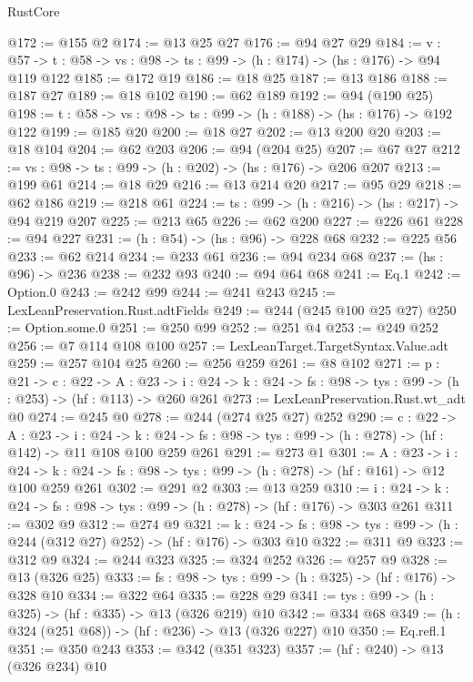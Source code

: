 \begin{lexlean}{RustCore}
\begin{coremodule}
@172 := @155 @2
@174 := @13 @25 @27
@176 := @94 @27 @29
@184 := {v : @57} ->
  {t : @58} -> {vs : @98} -> {ts : @99} -> (h : @174) -> (hs : @176) -> @94 @119 @122
@185 := @172 @19
@186 := @18 @25
@187 := @13 @186
@188 := @187 @27
@189 := @18 @102
@190 := @62 @189
@192 := @94 (@190 @25)
@198 := {t : @58} -> {vs : @98} -> {ts : @99} -> (h : @188) -> (hs : @176) -> @192 @122
@199 := @185 @20
@200 := @18 @27
@202 := @13 @200 @20
@203 := @18 @104
@204 := @62 @203
@206 := @94 (@204 @25)
@207 := @67 @27
@212 := {vs : @98} -> {ts : @99} -> (h : @202) -> (hs : @176) -> @206 @207
@213 := @199 @61
@214 := @18 @29
@216 := @13 @214 @20
@217 := @95 @29
@218 := @62 @186
@219 := @218 @61
@224 := {ts : @99} -> (h : @216) -> (hs : @217) -> @94 @219 @207
@225 := @213 @65
@226 := @62 @200
@227 := @226 @61
@228 := @94 @227
@231 := (h : @54) -> (hs : @96) -> @228 @68
@232 := @225 @56
@233 := @62 @214
@234 := @233 @61
@236 := @94 @234 @68
@237 := (hs : @96) -> @236
@238 := @232 @93
@240 := @94 @64 @68
@241 := Eq.{1}
@242 := Option.{0}
@243 := @242 @99
@244 := @241 @243
@245 := LexLeanPreservation.Rust.adtFields
@249 := @244 (@245 @100 @25 @27)
@250 := Option.some.{0}
@251 := @250 @99
@252 := @251 @4
@253 := @249 @252
@256 := @7 @114 @108 @100
@257 := LexLeanTarget.TargetSyntax.Value.adt
@259 := @257 @104 @25
@260 := @256 @259
@261 := @8 @102
@271 := {p : @21} ->
  {c : @22} ->
  {A : @23} ->
  {i : @24} -> {k : @24} -> {fs : @98} -> {tys : @99} -> (h : @253) -> (hf : @113) -> @260 @261
@273 := LexLeanPreservation.Rust.wt_adt @0
@274 := @245 @0
@278 := @244 (@274 @25 @27) @252
@290 := {c : @22} ->
  {A : @23} ->
  {i : @24} ->
  {k : @24} -> {fs : @98} -> {tys : @99} -> (h : @278) -> (hf : @142) -> @11 @108 @100 @259 @261
@291 := @273 @1
@301 := {A : @23} ->
  {i : @24} ->
  {k : @24} -> {fs : @98} -> {tys : @99} -> (h : @278) -> (hf : @161) -> @12 @100 @259 @261
@302 := @291 @2
@303 := @13 @259
@310 := {i : @24} ->
  {k : @24} -> {fs : @98} -> {tys : @99} -> (h : @278) -> (hf : @176) -> @303 @261
@311 := @302 @9
@312 := @274 @9
@321 := {k : @24} ->
  {fs : @98} -> {tys : @99} -> (h : @244 (@312 @27) @252) -> (hf : @176) -> @303 @10
@322 := @311 @9
@323 := @312 @9
@324 := @244 @323
@325 := @324 @252
@326 := @257 @9
@328 := @13 (@326 @25)
@333 := {fs : @98} -> {tys : @99} -> (h : @325) -> (hf : @176) -> @328 @10
@334 := @322 @64
@335 := @228 @29
@341 := {tys : @99} -> (h : @325) -> (hf : @335) -> @13 (@326 @219) @10
@342 := @334 @68
@349 := (h : @324 (@251 @68)) -> (hf : @236) -> @13 (@326 @227) @10
@350 := Eq.refl.{1}
@351 := @350 @243
@353 := @342 (@351 @323)
@357 := (hf : @240) -> @13 (@326 @234) @10

\end{coremodule}
\end{lexlean}
